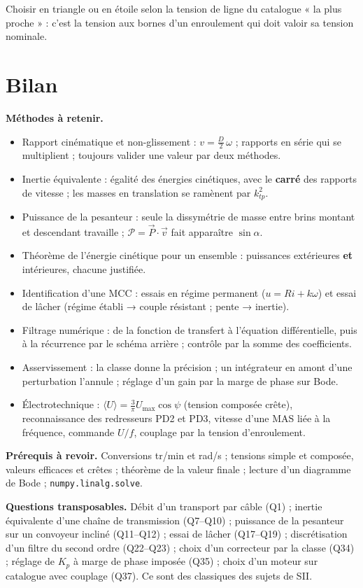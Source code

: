 \documentclass[11pt,a4paper]{article}
\providecommand{\tightlist}{\setlength{\itemsep}{0pt}\setlength{\parskip}{0pt}}
\begin{document}
\begin{piege}

Choisir en triangle ou en étoile selon la tension de ligne du catalogue « la plus proche » : c'est la tension aux bornes d'un enroulement qui doit valoir sa tension nominale.

\end{piege}

\hypertarget{bilan}{%
\section{Bilan}\label{bilan}}

\textbf{Méthodes à retenir.}

\begin{itemize}
\tightlist
\item
  Rapport cinématique et non-glissement : \(v=\tfrac D2\,\omega\) ; rapports en série qui se multiplient ; toujours valider une valeur par deux méthodes.
\item
  Inertie équivalente : égalité des énergies cinétiques, avec le \textbf{carré} des rapports de vitesse ; les masses en translation se ramènent par \(k_{tp}^2\).
\item
  Puissance de la pesanteur : seule la dissymétrie de masse entre brins montant et descendant travaille ; \(\mathscr P=\vec P\cdot\vec v\) fait apparaître \(\sin\alpha\).
\item
  Théorème de l'énergie cinétique pour un ensemble : puissances extérieures \textbf{et} intérieures, chacune justifiée.
\item
  Identification d'une MCC : essais en régime permanent (\(u=Ri+k\omega\)) et essai de lâcher (régime établi → couple résistant ; pente → inertie).
\item
  Filtrage numérique : de la fonction de transfert à l'équation différentielle, puis à la récurrence par le schéma arrière ; contrôle par la somme des coefficients.
\item
  Asservissement : la classe donne la précision ; un intégrateur en amont d'une perturbation l'annule ; réglage d'un gain par la marge de phase sur Bode.
\item
  Électrotechnique : \(\langle U\rangle=\tfrac3\pi U_{\max}\cos\psi\) (tension composée crête), reconnaissance des redresseurs PD2 et PD3, vitesse d'une MAS liée à la fréquence, commande \(U/f\), couplage par la tension d'enroulement.
\end{itemize}

\textbf{Prérequis à revoir.} Conversions tr/min et rad/s ; tensions simple et composée, valeurs efficaces et crêtes ; théorème de la valeur finale ; lecture d'un diagramme de Bode ; \texttt{numpy.linalg.solve}.

\textbf{Questions transposables.} Débit d'un transport par câble (Q1) ; inertie équivalente d'une chaîne de transmission (Q7--Q10) ; puissance de la pesanteur sur un convoyeur incliné (Q11--Q12) ; essai de lâcher (Q17--Q19) ; discrétisation d'un filtre du second ordre (Q22--Q23) ; choix d'un correcteur par la classe (Q34) ; réglage de \(K_p\) à marge de phase imposée (Q35) ; choix d'un moteur sur catalogue avec couplage (Q37). Ce sont des classiques des sujets de SII.
\end{document}
